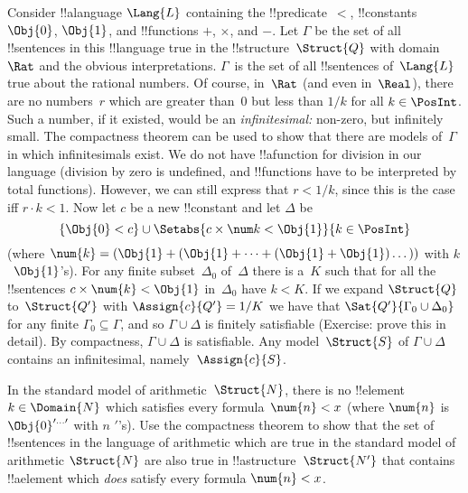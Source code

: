 \documentclass[../../../include/open-logic-section]{subfiles}
\begin{document}
{\begin{ex}
Consider !!a{language} $\Lang{L}$ containing the !!{predicate}~$<$,
!!{constant}s $\Obj{0}$, $\Obj{1}$, and !!{function}s $+$, $\times$, and
$-$. Let $\Gamma$ be the set of all !!{sentence}s in this
!!{language} true in the !!{structure}~$\Struct{Q}$ with domain~$\Rat$ and the obvious
interpretations.  $\Gamma$~is the set of all !!{sentence}s
of~$\Lang{L}$ true about the rational numbers. Of course, in~$\Rat$
(and even in~$\Real$), there are no numbers~$r$ which are greater than~$0$
but less than $1/k$ for all $k \in \PosInt$.  Such a number, if it
existed, would be an \emph{infinitesimal:} non-zero, but infinitely
small.  The compactness theorem can be used to show that there are 
models of~$\Gamma$ in which infinitesimals exist. We do not have 
!!a{function} for division in our language (division by zero is 
undefined, and !!{function}s have to be interpreted by total functions).
However, we can still express that $r < 1/k$, since this is the case iff
$r \cdot k < 1$. Now let $c$ be a new !!{constant} and let $\Delta$ be 
\[
\{\Obj{0} < c\}
\cup \Setabs{ c \times \num k < \Obj{1} }{k \in \PosInt}
\]
(where $\num{k} = (\Obj{1} + (\Obj{1} + \dots + (\Obj{1} +
\Obj{1})\dots))$ with $k$~$\Obj{1}$'s). For any finite
subset~$\Delta_0$ of~$\Delta$ there is a~$K$ such that for all the
!!{sentence}s $c \times \num{k} < \Obj{1}$ in~$\Delta_0$ have $k < K$.
If we expand $\Struct{Q}$ to~$\Struct{Q'}$ with $\Assign{c}{Q'} = 1/K$
we have that $\Sat{Q'}{\Gamma_0 \cup \Delta_0}$ for any finite
$\Gamma_0 \subseteq \Gamma$, and so $\Gamma \cup \Delta$ is finitely
satisfiable (Exercise: prove this in detail). By compactness, $\Gamma
\cup \Delta$ is satisfiable. Any model~$\Struct{S}$ of $\Gamma \cup
\Delta$ contains an infinitesimal, namely~$\Assign{c}{S}$.
\end{ex}
}{}

\begin{prob}
In the standard model of arithmetic~$\Struct{N}$, there is no
!!{element}~$k \in \Domain{N}$ which satisfies every formula~$\num{n}
< x$ (where $\num{n}$ is $\Obj{0}^{\prime\dots\prime}$ with $n$
$\prime$'s).  Use the compactness theorem to show that the set of
!!{sentence}s in the language of arithmetic which are true in the standard
model of arithmetic $\Struct{N}$ are also true in
!!a{structure}~$\Struct{N'}$ that contains !!a{element} which
\emph{does} satisfy every formula $\num{n} < x$.
\end{prob}
\tagendprob
\end{document}
